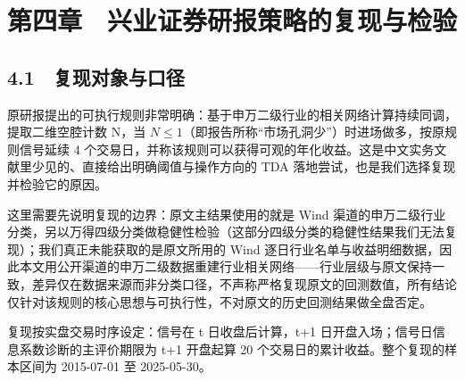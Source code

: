 \documentclass[12pt,a4paper]{ctexart}
\begin{document}
\section{第四章　兴业证券研报策略的复现与检验}
\subsection{4.1　复现对象与口径}
原研报提出的可执行规则非常明确：基于申万二级行业的相关网络计算持续同调，提取二维空腔计数 N，当 \(N \le 1\)（即报告所称“市场孔洞少”）时进场做多，按原规则信号延续 4 个交易日，并称该规则可以获得可观的年化收益。这是中文实务文献里少见的、直接给出明确阈值与操作方向的 TDA 落地尝试，也是我们选择复现并检验它的原因。\par

这里需要先说明复现的边界：原文主结果使用的就是 Wind 渠道的申万二级行业分类，另以万得四级分类做稳健性检验（这部分四级分类的稳健性结果我们无法复现）；我们真正未能获取的是原文所用的 Wind 逐日行业名单与收益明细数据，因此本文用公开渠道的申万二级数据重建行业相关网络——行业层级与原文保持一致，差异仅在数据来源而非分类口径，不声称严格复现原文的回测数值，所有结论仅针对该规则的核心思想与可执行性，不对原文的历史回测结果做全盘否定。\par

复现按实盘交易时序设定：信号在 t 日收盘后计算，t+1 日开盘入场；信号日信息系数诊断的主评价期限为 t+1 开盘起算 20 个交易日的累计收益。整个复现的样本区间为 2015-07-01 至 2025-05-30。\par
\end{document}
